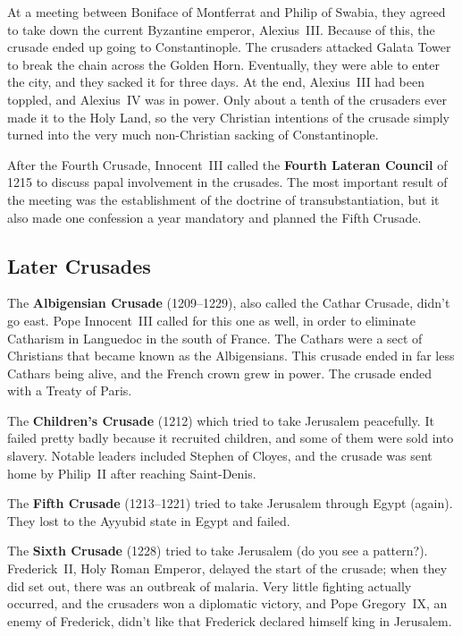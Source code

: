 At a meeting between Boniface of Montferrat and Philip of Swabia,
they agreed to take down the current Byzantine emperor, Alexius~III\@.
Because of this, the crusade ended up going to Constantinople.
The crusaders attacked Galata Tower to break the chain across the Golden Horn.
Eventually, they were able to enter the city, and they sacked it for three days.
At the end, Alexius~III had been toppled, and Alexius~IV was in power.
Only about a tenth of the crusaders ever made it to the Holy Land,
so the very Christian intentions of the crusade simply turned into
the very much non-Christian sacking of Constantinople.

After the Fourth Crusade,
Innocent~III called the \textbf{Fourth Lateran Council} of 1215 to discuss papal involvement in the crusades.
The most important result of the meeting was the establishment of the doctrine of transubstantiation,
but it also made one confession a year mandatory and planned the Fifth Crusade.

\subsection*{Later Crusades}

The \textbf{Albigensian Crusade} (1209--1229), also called the Cathar Crusade, didn't go east.
Pope Innocent~III called for this one as well,
in order to eliminate Catharism in Languedoc in the south of France.
The Cathars were a sect of Christians that became known as the Albigensians.
This crusade ended in far less Cathars being alive, and the French crown grew in power.
The crusade ended with a Treaty of Paris.

The \textbf{Children's Crusade} (1212) which tried to take Jerusalem peacefully.
It failed pretty badly because it recruited children, and some of them were sold into slavery.
Notable leaders included Stephen of Cloyes, and the crusade was sent home by Philip~II after reaching Saint-Denis.

The \textbf{Fifth Crusade} (1213--1221) tried to take Jerusalem through Egypt (again).
They lost to the Ayyubid state in Egypt and failed.

The \textbf{Sixth Crusade} (1228) tried to take Jerusalem (do you see a pattern?).
Frederick~II, Holy Roman Emperor, delayed the start of the crusade;
when they did set out, there was an outbreak of malaria.
Very little fighting actually occurred, and the crusaders won a diplomatic victory,
and Pope Gregory~IX, an enemy of Frederick, didn't like that Frederick declared himself king in Jerusalem.

